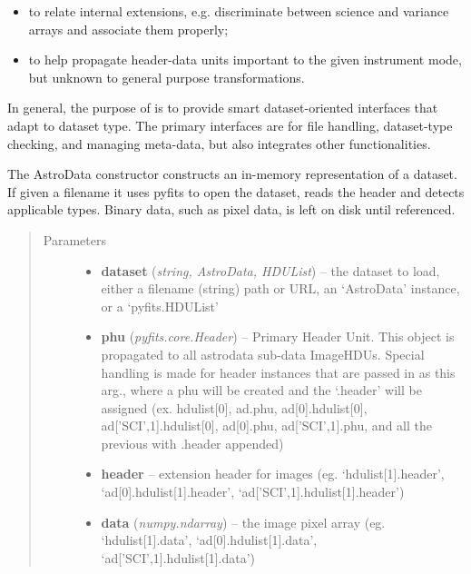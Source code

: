 \documentclass[letterpaper,10pt,english]{sphinxmanual}
\begin{document}
\begin{fulllineitems}
\begin{itemize}
\item {} 
to relate internal extensions, e.g. discriminate between science and 
variance arrays and associate them properly;

\item {} 
to help propagate header-data units important to the given instrument mode,
but unknown to general purpose transformations.

\end{itemize}

In general, the purpose of  is to provide smart dataset-oriented
interfaces that adapt to dataset type. The primary interfaces are for file
handling, dataset-type checking, and managing meta-data, but  
also integrates other functionalities.

The AstroData constructor constructs an in-memory representation of a
dataset. If given a filename it uses pyfits to open the dataset, reads
the header and detects applicable types. Binary data, such as pixel
data, is left on disk until referenced.
\begin{quote}\begin{description}
\item[{Parameters}] \leavevmode\begin{itemize}
\item {} 
\textbf{dataset} (\emph{string, AstroData, HDUList}) -- the dataset to load, either a filename (string) path
or URL, an `AstroData' instance, or a `pyfits.HDUList'

\item {} 
\textbf{phu} (\emph{pyfits.core.Header}) -- Primary Header Unit. This object is propagated to all 
astrodata sub-data ImageHDUs. Special handling is made 
for header instances that are passed in as this arg., 
where a phu will be created and the `.header' will be 
assigned (ex. hdulist{[}0{]}, ad.phu, ad{[}0{]}.hdulist{[}0{]}, 
ad{[}'SCI',1{]}.hdulist{[}0{]}, ad{[}0{]}.phu, ad{[}'SCI',1{]}.phu, 
and all the previous with .header appended)

\item {} 
\textbf{header} -- extension header for images (eg. `hdulist{[}1{]}.header',
`ad{[}0{]}.hdulist{[}1{]}.header', `ad{[}'SCI',1{]}.hdulist{[}1{]}.header')

\item {} 
\textbf{data} (\emph{numpy.ndarray}) -- the image pixel array (eg. `hdulist{[}1{]}.data',
`ad{[}0{]}.hdulist{[}1{]}.data', `ad{[}'SCI',1{]}.hdulist{[}1{]}.data')


\end{itemize}
\end{description}
\end{quote}
\end{fulllineitems}
\end{document}
